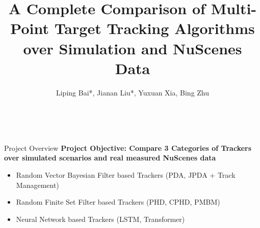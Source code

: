 \documentclass[12pt]{beamer}
\let\olditem\item
\renewcommand\item{\olditem\justifying}
\begin{document}
  
	\author[Liping Bai*, Jianan Liu*, Yuxuan Xia, Bing Zhu]{Liping Bai*, Jianan Liu*, Yuxuan Xia, Bing Zhu}
	\title{\textbf{A Complete Comparison of Multi-Point Target Tracking Algorithms over Simulation and NuScenes Data}}
	\begin{frame}[plain]
		\vspace*{5pt}
		\centering{\textbf{}}\\
		\centering{\texttt{}}
		\vspace*{10pt}
		\maketitle
	\end{frame}


\begin{frame}{Project Overview}
\textbf{Project Objective: Compare 3 Categories of Trackers over simulated scenarios and real measured NuScenes data}
	\begin{itemize}
		    \item Random Vector Bayesian Filter based Trackers (PDA, JPDA + Track Management)
		    \item Random Finite Set Filter based Trackers (PHD, CPHD, PMBM)
		    \item Neural Network based Trackers (LSTM, Transformer)
	\end{itemize}
\end{frame}
\end{document}
